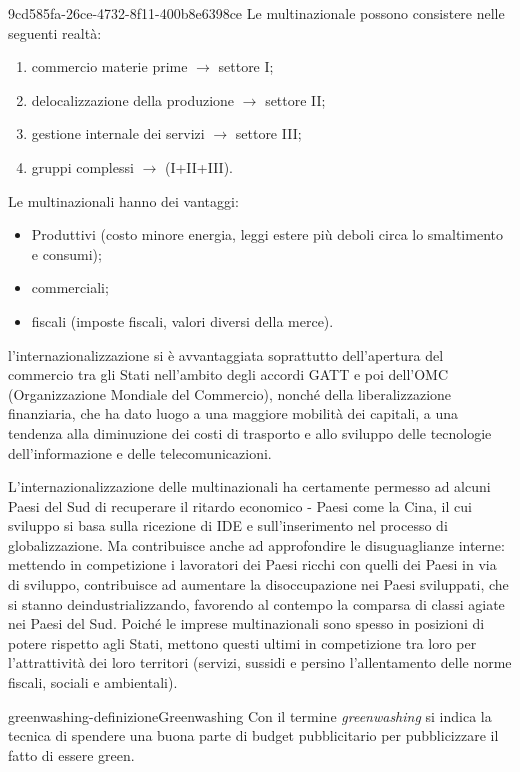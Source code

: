 \documentclass[preview]{standalone}
\begin{document}
\begin{snippet}{9cd585fa-26ce-4732-8f11-400b8e6398ce}
    Le multinazionale possono consistere nelle seguenti realtà:
    \begin{enumerate}
        \item commercio materie prime \(\rightarrow\) settore I;
        \item delocalizzazione della produzione \(\rightarrow\) settore II;
        \item gestione internale dei servizi \(\rightarrow\) settore III;
        \item gruppi complessi \(\rightarrow\) (I+II+III).
    \end{enumerate}
    
    Le multinazionali hanno dei vantaggi:
    \begin{itemize}
        \item Produttivi (costo minore energia, leggi estere più deboli circa lo smaltimento e consumi);
        \item commerciali;
        \item fiscali (imposte fiscali, valori diversi della merce).
    \end{itemize}
    
    l'internazionalizzazione si è avvantaggiata
    soprattutto dell'apertura del commercio tra gli Stati nell'ambito degli accordi GATT
    e poi dell'OMC (Organizzazione Mondiale del Commercio),
    nonché della liberalizzazione finanziaria, che ha dato luogo a una maggiore mobilità dei capitali, a
    una tendenza alla diminuzione dei costi di trasporto e allo sviluppo delle tecnologie
    dell'informazione e delle telecomunicazioni.
    
    L'internazionalizzazione delle multinazionali ha certamente permesso ad alcuni Paesi del Sud di
    recuperare il ritardo economico - Paesi come la Cina, il cui sviluppo si basa sulla ricezione di IDE e
    sull'inserimento nel processo di globalizzazione. Ma contribuisce anche ad approfondire le
    disuguaglianze interne: mettendo in competizione i lavoratori dei Paesi ricchi con quelli dei Paesi
    in via di sviluppo, contribuisce ad aumentare la disoccupazione nei Paesi sviluppati, che si stanno
    deindustrializzando, favorendo al contempo la comparsa di classi agiate nei Paesi del Sud. Poiché
    le imprese multinazionali sono spesso in posizioni di potere rispetto agli Stati, mettono questi
    ultimi in competizione tra loro per l'attrattività dei loro territori (servizi, sussidi e persino
    l'allentamento delle norme fiscali, sociali e ambientali).
\end{snippet}

\begin{snippetdefinition}{greenwashing-definizione}{Greenwashing}
    Con il termine \textit{greenwashing} si indica la tecnica di
    spendere una buona parte di budget pubblicitario per pubblicizzare il fatto di essere green.
\end{snippetdefinition}

\end{document}
